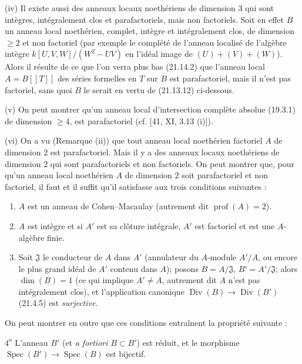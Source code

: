 \begin{env}[21.13.9]
(iv) Il existe aussi des anneaux locaux noethériens de dimension $3$ qui sont
intègres, intégralement clos et parafactoriels, mais non factoriels. Soit en effet $B$
un anneau local noethérien, complet, intègre et intégralement clos, de dimension
$\geq2$ et non factoriel (par exemple le complété de l'anneau localisé de l'algèbre
intègre $k[U,V,W]/(W^2-UV)$ en l'idéal image de $(U)+(V)+(W)$). Alors il résulte de
ce que l'on verra plus bas (21.14.2) que l'anneau local $A=B[[T]]$ des séries formelles
en $T$ sur $B$ est parafactoriel, mais il n'est pas factoriel, sans quoi $B$ le serait
en vertu de (21.13.12) ci-dessous.

(v) On peut montrer qu'un anneau local d'intersection complète absolue (19.3.1) de
dimension $\geq4$, est parafactoriel (cf. [41, XI, 3.13 (i)]).

(vi) On a vu (Remarque (ii)) que tout anneau local noethérien factoriel $A$ de
dimension $2$ est parafactoriel. Mais il y a des anneaux locaux noethériens de
dimension $2$ qui sont parafactoriels et non factoriels. On peut montrer que, pour
qu'un anneau local noethérien $A$ de dimension $2$ soit parafactoriel et non
factoriel, il faut et il suffit qu'il satisfasse aux trois conditions suivantes :
\begin{enumerate}[label=\arabic*\textsuperscript{o}]
  \item $A$ est un anneau de Cohen--Macaulay (autrement dit
  $\operatorname{prof}(A)=2$).
  \item $A$ est intègre et si $A'$ est sa clôture intégrale, $A'$ est factoriel et est
  une $A$-algèbre finie.
  \item Soit $\mathfrak J$ le conducteur de $A$ dans $A'$ (annulateur du $A$-module
  $A'/A$, ou encore le plus grand idéal de $A'$ contenu dans $A$); posons
  $B=A/\mathfrak J$, $B'=A'/\mathfrak J$; alors $\dim(B)=1$ (ce qui implique
  $A'\neq A$, autrement dit $A$ n'est pas intégralement clos), et l'application
  canonique $\operatorname{Div}(B)\to\operatorname{Div}(B')$ (21.4.5) est
  \emph{surjective}.
\end{enumerate}
On peut montrer en outre que ces conditions entraînent la propriété suivante :

$4^{\mathrm o}$ L'anneau $B'$ (et \emph{a fortiori} $B\subset B'$) est réduit, et le
morphisme $\operatorname{Spec}(B')\to\operatorname{Spec}(B)$ est bijectif.


\end{env}

